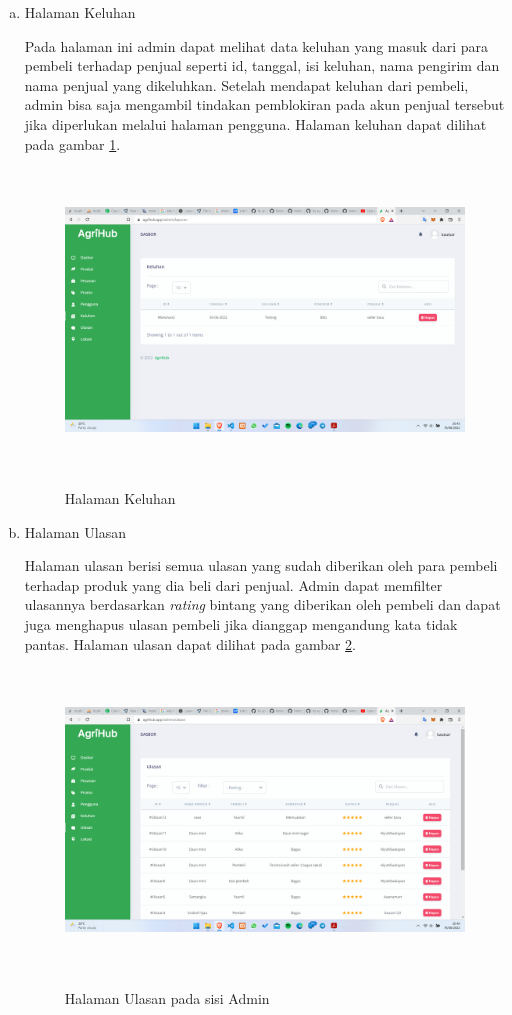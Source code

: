 \begin{enumerate}
\begin{enumerate}[a.]
		\item Halaman Keluhan
		\par Pada halaman ini admin dapat melihat data keluhan yang masuk dari para pembeli terhadap penjual seperti id, tanggal, isi keluhan, nama pengirim dan nama penjual yang dikeluhkan. Setelah mendapat keluhan dari pembeli, admin bisa saja mengambil tindakan pemblokiran pada akun penjual tersebut jika diperlukan melalui halaman pengguna. Halaman keluhan dapat dilihat pada gambar \ref*{keluhan}.
		\begin{figure}[H]
			\centering
			{\includegraphics [width = 13.5cm, height= 8cm]{gambar/admin/keluhan}}
			\caption{Halaman Keluhan}
			\label{keluhan}
		\end{figure}

		\item Halaman Ulasan
		\par Halaman ulasan berisi semua ulasan yang sudah diberikan oleh para pembeli terhadap produk yang dia beli dari penjual. Admin dapat memfilter ulasannya berdasarkan \textit{rating} bintang yang diberikan oleh pembeli dan dapat juga menghapus ulasan pembeli jika dianggap mengandung kata tidak pantas. Halaman ulasan dapat dilihat pada gambar \ref*{ulasan_admin}.
		\begin{figure}[H]
			\centering
			{\includegraphics [width = 13.5cm, height= 8cm]{gambar/admin/ulasan_admin}}
			\caption{Halaman Ulasan pada sisi Admin}
			\label{ulasan_admin}
		\end{figure}


\end{enumerate}
\end{enumerate}
